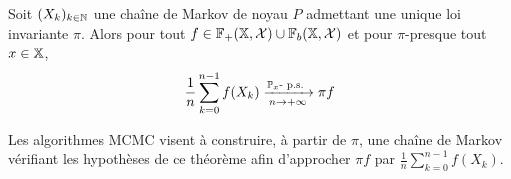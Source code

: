 \documentclass[10pt,a4paper]{article}
\begin{document}


\begin{Thm}\label{thm:ergodic}
	Soit $(X_k)_{k \in \mathbb{N}}$ une chaîne de Markov de noyau $P$ admettant une unique loi invariante $\pi$. Alors pour tout $f \in \mathbb{F}_+(\mathbb{X}, \mathcal{X}) \cup \mathbb{F}_b(\mathbb{X}, \mathcal{X})$ et pour $\pi$-presque tout $x \in \mathbb{X}$,
	$$\frac{1}{n} \sum_{k=0}^{n-1} f(X_k) \xrightarrow[n \to +\infty]{\PP_x\text{-}\ps} \pi f$$
\end{Thm}

Les algorithmes MCMC visent à construire, à partir de $\pi$, une chaîne de Markov vérifiant les hypothèses de ce théorème afin d'approcher $\pi f$ par $\frac{1}{n} \sum_{k=0}^{n-1} f(X_k)$.
\end{document}
